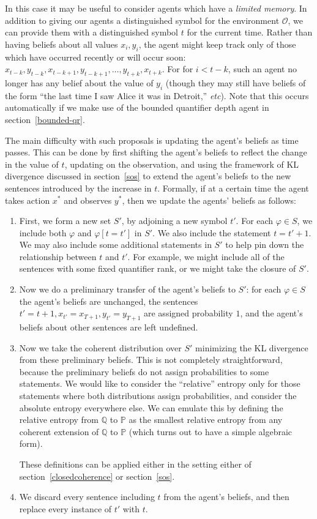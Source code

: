 \documentclass[12pt]{article}
\theoremstyle{definition}
\newcommand{\QQ}{\mathbb{Q}}
\renewcommand{\O}{\mathcal{O}}
\newcommand{\PP}{\mathbb{P}}
\newcommand{\vp}{\varphi}
\begin{document}
In this case it may be useful to consider agents which have a \emph{limited memory}.
In addition to giving our agents a distinguished symbol for the environment $\O$,
we can provide them with a distinguished symbol $t$ for the current time.
Rather than having beliefs about all values $x_i, y_i$, the agent might keep track
only of those which have occurred recently or will occur soon: $x_{t-k}, y_{t-k}, x_{t-k+1}, y_{t-k+1}, \ldots, y_{t+k}, x_{t+k}$.
For for $i < t-k$, such an agent no longer has any belief about the value of $y_i$
(though they may still have beliefs of the form ``the last time I saw Alice it was in Detroit,'' \emph{etc}).
Note that this occurs automatically if we make use of the bounded quantifier depth agent in section~\ref{bounded-qr}.

The main difficulty with such proposals is updating the agent's beliefs as time passes.
This can be done by first shifting the agent's beliefs
to reflect the change in the value of $t$,
updating on the observation,
and using the framework of KL divergence discussed
in section~\ref{sos} to extend the agent's beliefs to the new sentences
introduced by the increase in $t$.
Formally, if at a certain time the agent takes action $x^*$
and observes $y^*$, 
then we update the agents' beliefs as follows:
\begin{enumerate}
\item First, we form a new set $S'$, by adjoining a new symbol $t'$.
For each $\vp \in S$, we include both $\vp$ and $\vp\left[t = t'\right]$ in $S'$.
We also include the statement $t = t'+1$.
We may also include some additional statements in $S'$ to help pin down the relationship
between $t$ and $t'$.
For example, we might include all of the sentences with some fixed quantifier rank,
or we might take the closure of $S'$.
\item Now we do a preliminary transfer of the agent's beliefs to $S'$:
for each $\vp \in S$ the agent's beliefs are unchanged,
the sentences $t' = t+1, x_{t'} = x_{T+1}, y_{t'} = y_{T+1}$ are assigned probability $1$,
and the agent's beliefs about other sentences are left undefined.
\item Now we take the coherent distribution over $S'$ minimizing the KL divergence from these
preliminary beliefs. This is not completely straightforward,
because the preliminary beliefs do not assign probabilities to some statements.
We would like to consider the ``relative'' entropy only for those statements
where both distributions assign probabilities, and consider the absolute entropy
everywhere else.
We can emulate this by defining the relative entropy from $\QQ$ to $\PP$
as the smallest relative entropy from any coherent extension of $\QQ$ to $\PP$
(which turns out to have a simple algebraic form).

These definitions can be applied either in the setting either of section~\ref{closedcoherence}
or section~\ref{sos}.

\item We discard every sentence including $t$ from the agent's beliefs, 
and then replace every instance of $t'$ with $t$.
\end{enumerate}
\end{document}
